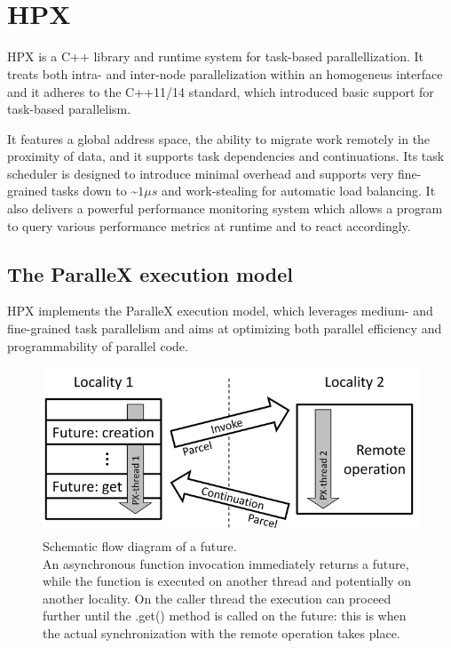 
~\\~
\section{HPX} \label{sec:hpx}
HPX is a C++ library and runtime system for task-based parallellization. It treats both intra- and inter-node parallelization within an homogeneus interface and it adheres to the C++11/14 standard, which introduced basic support for task-based parallelism.

It features a global address space, the ability to migrate work remotely in the proximity of data, and it supports task dependencies and continuations.
Its task scheduler is designed to introduce minimal overhead and supports very fine-grained tasks down to \textasciitilde$1\mu s$\cite{grubel2016using} and work-stealing for automatic load balancing.
It also delivers a powerful performance monitoring system which allows a program to query various performance metrics at runtime and to react accordingly.

\subsection{The ParalleX execution model}\label{subs:parallexModel}
HPX implements the ParalleX \cite{kaiser2009parallex} execution model, which leverages medium- and fine-grained task parallelism and aims at optimizing both parallel efficiency and programmability of parallel code.

\begin{figure}[t]
 	\begin{center}
 		\includegraphics[scale=0.3]{Figures/futureFlowDiagram.png}
 		\caption{Schematic flow diagram of a future\cite{kaiser2009parallex}.\\
 		An asynchronous function invocation immediately returns a future, while the function is executed on another thread and potentially on another locality. On the caller thread the execution can proceed further until the .get() method is called on the future: this is when the actual synchronization with the remote operation takes place.}\label{fig:futureFlowDiagram}
 	\end{center}
\end{figure}

